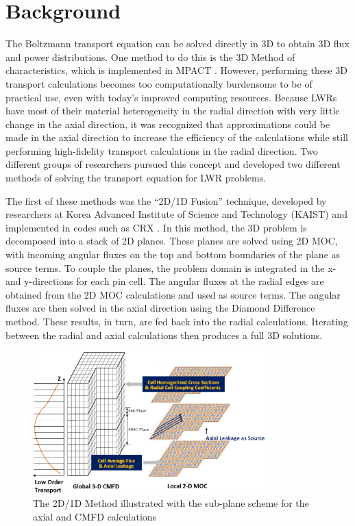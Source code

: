 \section{Background}

The Boltzmann transport equation can be solved directly in 3D to obtain 3D flux and power distributions.  One method to do this is the 3D Method of characteristics, which is implemented in MPACT \cite{KochunasThesis}.  However, performing these 3D transport calculations becomes too computationally burdensome to be of practical use, even with today's improved computing resources.  Because LWRs have most of their material heterogeneity in the radial direction with very little change in the axial direction, it was recognized that approximations could be made in the axial direction to increase the efficiency of the calculations while still performing high-fidelity transport calculations in the radial direction.  Two different groups of researchers pursued this concept and developed two different methods of solving the transport equation for LWR problems.

The first of these methods was the ``2D/1D Fusion'' technique, developed by researchers at Korea Advanced Institute of Science and Technology (KAIST) and implemented in codes such as CRX \cite{Fusion2D1D,FusionMOC}.  In this method, the 3D problem is decomposed into a stack of 2D planes.  These planes are solved using 2D MOC, with incoming angular fluxes on the top and bottom boundaries of the plane as source terms.  To couple the planes, the problem domain is integrated in the x- and y-directions for each pin cell.  The angular fluxes at the radial edges are obtained from the 2D MOC calculations and used as source terms.  The angular fluxes are then solved in the axial direction using the Diamond Difference  method.  These results, in turn, are fed back into the radial calculations.  Iterating between the radial and axial calculations then produces a full 3D solutions.

\begin{figure}[h]
    \centering
    \includegraphics[width=0.8\textwidth]{../figs/2d1d-subplane.png}
    \caption[2D/1D Illustration]{The 2D/1D Method illustrated with the sub-plane scheme for the axial and CMFD calculations}
    \label{f:2d1dsubpalne}
\end{figure}

